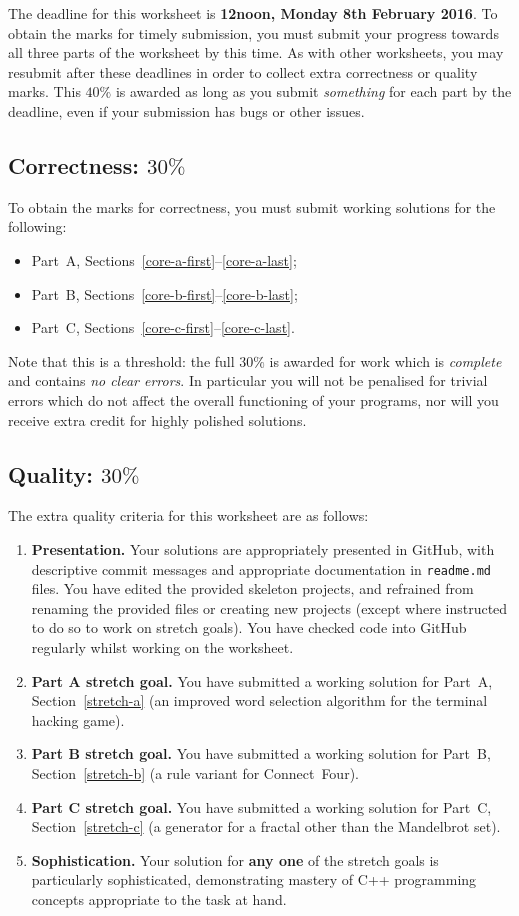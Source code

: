\documentclass{scrartcl}
\begin{document}
The deadline for this worksheet is \textbf{12noon, Monday 8th February 2016}.
To obtain the marks for timely submission, you must submit your progress towards all three parts of the worksheet by this time.
As with other worksheets, you may resubmit after these deadlines in order to collect extra correctness or quality marks.
This $40\%$ is awarded as long as you submit \emph{something} for each part by the deadline,
even if your submission has bugs or other issues.

\subsection*{Correctness: $30\%$}

To obtain the marks for correctness, you must submit working solutions for the following:
\begin{itemize}
\item Part~A, Sections~\ref{core-a-first}--\ref{core-a-last};
\item Part~B, Sections~\ref{core-b-first}--\ref{core-b-last};
\item Part~C, Sections~\ref{core-c-first}--\ref{core-c-last}.
\end{itemize}
Note that this is a threshold: the full $30\%$ is awarded for work which is \emph{complete}
and contains \emph{no clear errors}. In particular you will not be penalised for trivial errors which do not
affect the overall functioning of your programs, nor will you receive extra credit for highly polished solutions.

\subsection*{Quality: $30\%$}

The extra quality criteria for this worksheet are as follows:
\begin{enumerate}
\item\textbf{Presentation.} Your solutions are appropriately presented in GitHub, with descriptive commit messages
	and appropriate documentation in \texttt{readme.md} files.
	You have edited the provided skeleton projects, and refrained from renaming the provided files or creating new projects
        (except where instructed to do so to work on stretch goals).
    You have checked code into GitHub regularly whilst working on the worksheet.
\item\textbf{Part A stretch goal.} You have submitted a working solution for Part~A, Section~\ref{stretch-a} (an improved word selection algorithm for the terminal hacking game).
\item\textbf{Part B stretch goal.} You have submitted a working solution for Part~B, Section~\ref{stretch-b} (a rule variant for Connect~Four).
\item\textbf{Part C stretch goal.} You have submitted a working solution for Part~C, Section~\ref{stretch-c} (a generator for a fractal other than the Mandelbrot set).
\item\textbf{Sophistication.} Your solution for \textbf{any one} of the stretch goals is particularly sophisticated,
	demonstrating mastery of C++ programming concepts appropriate to the task at hand.
\end{enumerate}

\clearpage


\clearpage


\clearpage

\end{document}
